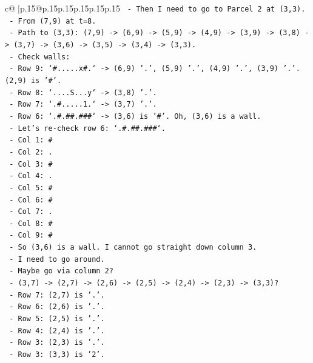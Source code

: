 \documentclass{article}
\begin{document}
{\begin{supertabular}{c@{$\;$}|p{.15\linewidth}@{}p{.15\linewidth}p{.15\linewidth}p{.15\linewidth}p{.15\linewidth}p{.15\linewidth}}
{{{\texttt{    {-} Then I need to go to Parcel 2 at (3,3).} \\
\texttt{      {-} From (7,9) at t=8.} \\
\texttt{      {-} Path to (3,3): (7,9) {-}> (6,9) {-}> (5,9) {-}> (4,9) {-}> (3,9) {-}> (3,8) {-}> (3,7) {-}> (3,6) {-}> (3,5) {-}> (3,4) {-}> (3,3).} \\
\texttt{      {-} Check walls:} \\
\texttt{        {-} Row 9: `\#.....x\#.` {-}> (6,9) '.', (5,9) '.', (4,9) '.', (3,9) '.'. (2,9) is '\#'.} \\
\texttt{        {-} Row 8: `....S...y` {-}> (3,8) '.'.} \\
\texttt{        {-} Row 7: `.\#.....1.` {-}> (3,7) '.'.} \\
\texttt{        {-} Row 6: `.\#.\#\#.\#\#\#` {-}> (3,6) is '\#'. Oh, (3,6) is a wall.} \\
\texttt{        {-} Let's re{-}check row 6: `.\#.\#\#.\#\#\#`.} \\
\texttt{          {-} Col 1: \#} \\
\texttt{          {-} Col 2: .} \\
\texttt{          {-} Col 3: \#} \\
\texttt{          {-} Col 4: .} \\
\texttt{          {-} Col 5: \#} \\
\texttt{          {-} Col 6: \#} \\
\texttt{          {-} Col 7: .} \\
\texttt{          {-} Col 8: \#} \\
\texttt{          {-} Col 9: \#} \\
\texttt{        {-} So (3,6) is a wall. I cannot go straight down column 3.} \\
\texttt{        {-} I need to go around.} \\
\texttt{        {-} Maybe go via column 2?} \\
\texttt{          {-} (3,7) {-}> (2,7) {-}> (2,6) {-}> (2,5) {-}> (2,4) {-}> (2,3) {-}> (3,3)?} \\
\texttt{          {-} Row 7: (2,7) is '.'.} \\
\texttt{          {-} Row 6: (2,6) is '.'.} \\
\texttt{          {-} Row 5: (2,5) is '.'.} \\
\texttt{          {-} Row 4: (2,4) is '.'.} \\
\texttt{          {-} Row 3: (2,3) is '.'.} \\
\texttt{          {-} Row 3: (3,3) is '2'.} \\
}}}
\end{supertabular}}
\end{document}
